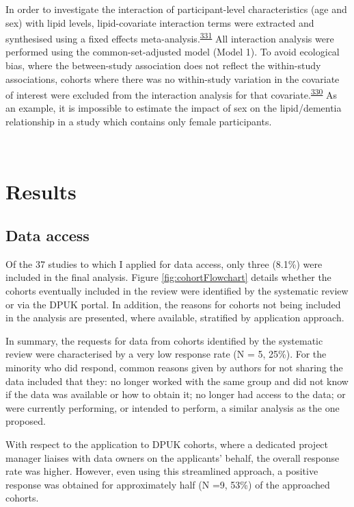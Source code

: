 \documentclass[a4paper, twoside]{templates/ociamthesis}
\begin{document}
In order to investigate the interaction of participant-level characteristics (age and sex) with lipid levels, lipid-covariate interaction terms were extracted and synthesised using a fixed effects meta-analysis.\textsuperscript{\protect\hyperlink{ref-fisher2017}{331}} All interaction analysis were performed using the common-set-adjusted model (Model 1). To avoid ecological bias, where the between-study association does not reflect the within-study associations, cohorts where there was no within-study variation in the covariate of interest were excluded from the interaction analysis for that covariate.\textsuperscript{\protect\hyperlink{ref-burke2017}{330}} As an example, it is impossible to estimate the impact of sex on the lipid/dementia relationship in a study which contains only female participants.

~

\hypertarget{results-1}{%
\section{Results}\label{results-1}}

\hypertarget{data-access}{%
\subsection{Data access}\label{data-access}}

Of the 37 studies to which I applied for data access, only three (8.1\%) were included in the final analysis. Figure \ref{fig:cohortFlowchart} details whether the cohorts eventually included in the review were identified by the systematic review or via the DPUK portal. In addition, the reasons for cohorts not being included in the analysis are presented, where available, stratified by application approach.

In summary, the requests for data from cohorts identified by the systematic review were characterised by a very low response rate (N = 5, 25\%). For the minority who did respond, common reasons given by authors for not sharing the data included that they: no longer worked with the same group and did not know if the data was available or how to obtain it; no longer had access to the data; or were currently performing, or intended to perform, a similar analysis as the one proposed.

With respect to the application to DPUK cohorts, where a dedicated project manager liaises with data owners on the applicants' behalf, the overall response rate was higher. However, even using this streamlined approach, a positive response was obtained for approximately half (N =9, 53\%) of the approached cohorts.
\end{document}
